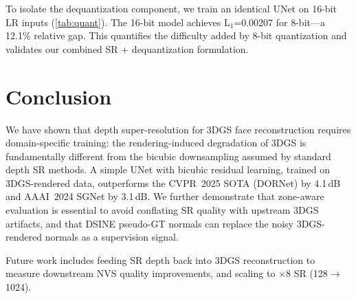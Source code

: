 \documentclass[10pt,twocolumn,letterpaper]{article}
\begin{document}
To isolate the dequantization component, we train an identical UNet on 16-bit LR inputs (\cref{tab:quant}).
The 16-bit model achieves L$_1$=0.00207  for 8-bit---a 12.1\% relative gap.
This quantifies the difficulty added by 8-bit quantization and validates our combined SR + dequantization formulation.

\section{Conclusion}
\label{sec:conclusion}

We have shown that depth super-resolution for 3DGS face reconstruction requires domain-specific training: the rendering-induced degradation of 3DGS is fundamentally different from the bicubic downsampling assumed by standard depth SR methods.
A simple UNet with bicubic residual learning, trained on 3DGS-rendered data, outperforms the CVPR~2025 SOTA (DORNet) by 4.1\,dB and AAAI~2024 SGNet by 3.1\,dB.
We further demonstrate that zone-aware evaluation is essential to avoid conflating SR quality with upstream 3DGS artifacts, and that DSINE pseudo-GT normals can replace the noisy 3DGS-rendered normals as a supervision signal.

Future work includes feeding SR depth back into 3DGS reconstruction to measure downstream NVS quality improvements, and scaling to $\times$8 SR (128$\to$1024).


{\small


}
\end{document}
